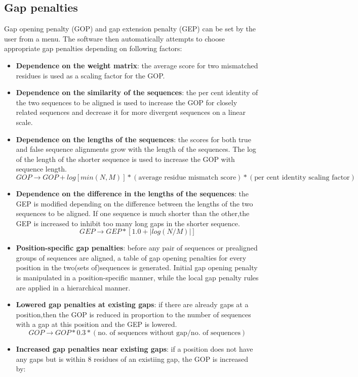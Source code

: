 \subsection{Gap penalties}
Gap opening penalty (GOP) and gap extension penalty (GEP) can be set by the user from a menu. 
The software then automatically attempts to choose appropriate gap penalties depending on following factors:
\begin{itemize}
\item \textbf{Dependence on the weight matrix}: the average score for two mismatched residues is used as a scaling factor for the GOP.
\item \textbf{Dependence on the similarity of the sequences}: the per cent identity of the two sequences to be aligned is used to increase the GOP for closely related sequences and decrease it for more divergent sequences on a linear scale.
\item \textbf{Dependence on the lengths of the sequences}: the scores for both true and false sequence alignments grow  with the length of the sequences. The log of the length of the shorter sequence is used to increase the GOP with sequence length. 
$$GOP \rightarrow {GOP+log[min(N,M)]}* (\text{average residue mismatch score}) * (\text{per cent identity scaling factor})$$
\item \textbf{Dependence on the difference in the lengths of the sequences}: the GEP is modified depending on the difference between the lengths of the two sequences to be aligned. If one sequence is much shorter than the other,the GEP is increased to inhibit too many long gaps in the shorter sequence.
$$GEP \rightarrow GEP * [1.0 + |log(N/M)|]$$
\item \textbf{Position-specific gap penalties}: before any pair of sequences or prealigned groups of sequences are aligned,  a table of gap opening penalties for every position in the two(sets  of)sequences is generated. Initial gap opening penalty is manipulated in a position-specific manner, while the local gap penalty rules are applied in a hierarchical manner.
\item \textbf{Lowered gap penalties at existing gaps}: if there are already gaps at a position,then the GOP is reduced in proportion to the number of sequences with a gap at this position and the GEP is lowered.
$$GOP  \rightarrow GOP*0.3*(\text{no. of sequences without  gap}/\text{no. of sequences})$$
\item \textbf{Increased gap penalties near existing gaps}: if a position does not have any gaps but is within 8 residues of an existiing gap, the GOP is increased by:

\end{itemize}
